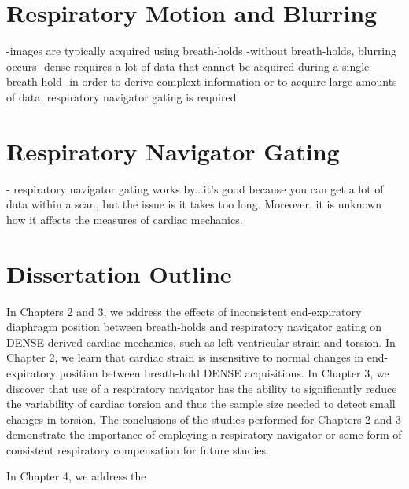 \section{Respiratory Motion and Blurring}
-images are typically acquired using breath-holds
-without breath-holds, blurring occurs
-dense requires a lot of data that cannot be acquired during a single breath-hold
-in order to derive complext information or to acquire large amounts of data, respiratory navigator gating is required

\section{Respiratory Navigator Gating}
- respiratory navigator gating works by...it's good because you can get a lot of data within a scan, but the issue is it takes too long. Moreover, it is unknown how it affects the measures of cardiac mechanics.

\section{Dissertation Outline}
\lipsum[6]

\index In Chapters 2 and 3, we address the effects of inconsistent end-expiratory diaphragm position between breath-holds and respiratory navigator gating on DENSE-derived cardiac mechanics, such as left ventricular strain and torsion. In Chapter 2, we learn that cardiac strain is insensitive to normal changes in end-expiratory position between breath-hold DENSE acquisitions. In Chapter 3, we discover that use of a respiratory navigator has the ability to significantly reduce the variability of cardiac torsion and thus the sample size needed to detect small changes in torsion. The conclusions of the studies performed for Chapters 2 and 3 demonstrate the importance of employing a respiratory navigator or some form of consistent respiratory compensation for future studies.

\index In Chapter 4, we address the 